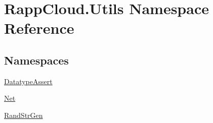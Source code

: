 \hypertarget{namespaceRappCloud_1_1Utils}{\section{Rapp\-Cloud.\-Utils Namespace Reference}
\label{namespaceRappCloud_1_1Utils}
}
\subsection*{Namespaces}
\begin{DoxyCompactItemize}
\item 
\hyperlink{namespaceRappCloud_1_1Utils_1_1DatatypeAssert}{Datatype\-Assert}
\item 
\hyperlink{namespaceRappCloud_1_1Utils_1_1Net}{Net}
\item 
\hyperlink{namespaceRappCloud_1_1Utils_1_1RandStrGen}{Rand\-Str\-Gen}
\end{DoxyCompactItemize}
